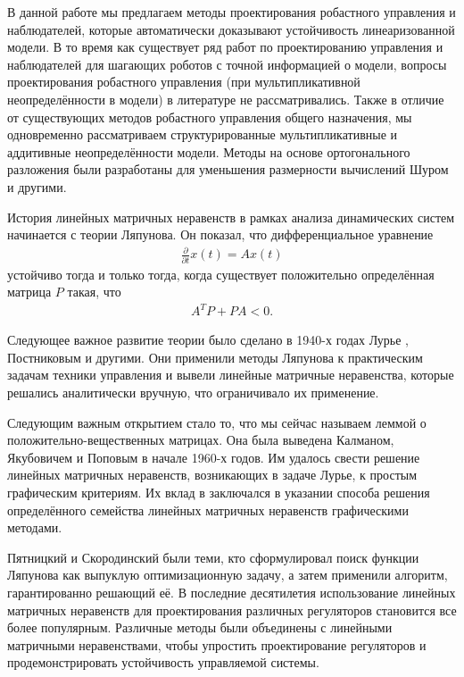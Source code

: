 В данной работе мы предлагаем методы проектирования робастного управления и наблюдателей, которые автоматически доказывают устойчивость линеаризованной модели. В то время как существует ряд работ по проектированию управления и наблюдателей для шагающих роботов с точной информацией о модели, вопросы проектирования робастного управления (при мультипликативной неопределённости в модели) в литературе не рассматривались. Также в отличие от существующих методов робастного управления общего назначения, мы одновременно рассматриваем структурированные мультипликативные и аддитивные неопределённости модели.
Методы на основе ортогонального разложения были разработаны для уменьшения размерности вычислений Шуром и другими.

{\progress}

История линейных матричных неравенств в рамках анализа динамических систем начинается с теории Ляпунова. Он показал, что дифференциальное уравнение
\begin{align*}
	\frac{\partial}{\partial t}x(t)=Ax(t)
\end{align*}
устойчиво тогда и только тогда, когда существует положительно определённая матрица $P$ такая, что
\begin{align*}
	A^T P + P A <0.
\end{align*}

Следующее важное развитие теории было сделано в 1940-х годах Лурье \cite{LMI1}, Постниковым и другими. 
Они применили методы Ляпунова к практическим задачам техники управления и вывели линейные матричные неравенства, которые решались аналитически вручную, что ограничивало их применение. 

Следующим важным открытием стало то, что мы сейчас называем леммой о положительно-вещественных матрицах. Она была выведена Калманом, Якубовичем и Поповым в начале 1960-х годов. Им удалось свести решение линейных матричных неравенств, возникающих в задаче Лурье, к простым графическим критериям. Их вклад в \cite{LMI2} заключался в указании способа решения определённого семейства линейных матричных неравенств графическими методами.

Пятницкий и Скородинский \cite{LMI3} были теми, кто сформулировал поиск функции Ляпунова как выпуклую оптимизационную задачу, а затем применили алгоритм, гарантированно решающий её.
В последние десятилетия использование линейных матричных неравенств для проектирования различных регуляторов становится все более популярным. Различные методы \cite{LMI4, LMI5} были объединены с линейными матричными неравенствами, чтобы упростить проектирование регуляторов и продемонстрировать устойчивость управляемой системы.

